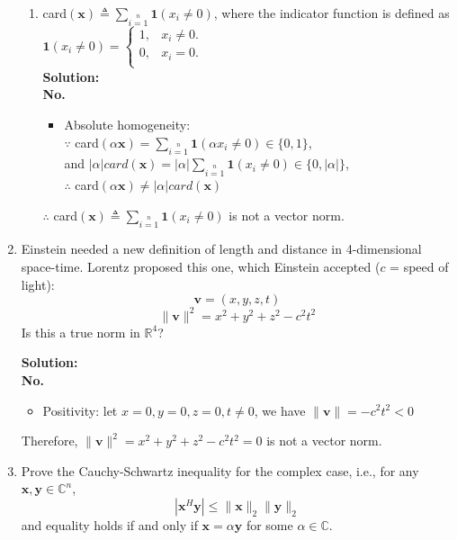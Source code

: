 \documentclass[12pt, letterpaper, onecolumn]{article}
\begin{document}
\begin{enumerate}[start=2]
\begin{enumerate}
			\item card$(\bm{x})\triangleq\sum\limits_{i=1}\limits^{n}{\bm{1}}(x_i\neq0)$, 
			where the indicator function is defined as\\
			$\bm{1}(x_i\neq0)=
				\begin{cases}
					1, & x_i\neq0.\\
					0, & x_i=0.\\
				\end{cases}
			$\\%
			\textbf{Solution:}\\
			\textbf{No.}
			\begin{itemize}
				\item Absolute homogeneity:\\
				$\because$ card$(\alpha\bm{x})=\sum\limits_{i=1}\limits^{n}\bm{1}(\alpha x_{i}\neq 0)\in\{0,1\}$, \\
				and $|\alpha|card(\bm{x})=|\alpha|\sum\limits_{i=1}\limits^{n}\bm{1}(x_{i}\neq 0)\in\{0,|\alpha|\}$, \\
				$\therefore$ card$(\alpha \bm{x}) \neq |\alpha|card(\bm{x})$
			\end{itemize}
			$\therefore$ card$(\bm{x})\triangleq\sum\limits_{i=1}\limits^{n}{\bm{1}}(x_i\neq0)$ is not a vector norm.

		\end{enumerate}

		\item Einstein needed a new definition of length and distance in 4-dimensional space-time. 
		Lorentz proposed this one, which Einstein accepted ($c$ = speed of light):
		\begin{equation}
			\bm{v}=(x,y,z,t)
		\end{equation}
		\begin{equation}
			\|\bm{v}\|^2=x^2+y^2+z^2-c^2t^2
		\end{equation}
		Is this a true norm in $\mathbb{R}^4$?%

		\textbf{Solution:}\\
		\textbf{No.}
		\begin{itemize}
			\item Positivity: let $x = 0, y = 0, z = 0, t \neq 0$, we have $\| \bm{v} \| = -c^2t^2 < 0$
		\end{itemize}
		Therefore, $\|\bm{v}\|^2=x^2+y^2+z^2-c^2t^2=0$ is not a vector norm.


		\item Prove the Cauchy-Schwartz inequality for the complex case, i.e., 
		for any $\bm{x,y}\in\mathbb{C}^n$,
		$$|\bm{x}^H\bm{y}|\leq\|\bm{x}\|_2\|\bm{y}\|_2$$
		and equality holds if and only if $\bm{x}=\alpha\bm{y}$ for some $\alpha\in\mathbb{C}$.%


\end{enumerate}
\end{document}

